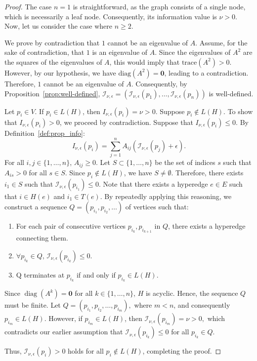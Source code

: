 \documentclass[10pt,a4paper]{amsart}
\begin{document}
\begin{proof}
The case \( n = 1 \) is straightforward, as the graph consists of a single node, which is necessarily a leaf node. Consequently, its information value is \( \nu > 0 \). Now, let us consider the case where \( n \geq 2 \).

We prove by contradiction that \( 1 \) cannot be an eigenvalue of \( A \). Assume, for the sake of contradiction, that \( 1 \) is an eigenvalue of \( A \). Since the eigenvalues of \( A^2 \) are the squares of the eigenvalues of \( A \), this would imply that \( \text{trace}(A^2) > 0 \). However, by our hypothesis, we have \( \text{diag}(A^2) = \mathbf{0} \), leading to a contradiction. Therefore, \( 1 \) cannot be an eigenvalue of \( A \). Consequently, by Proposition~\ref{prop:well-defined}, \( \mathcal{I}_{\nu, \epsilon} = (\mathcal{I}_{\nu, \epsilon}(p_1), \ldots, \mathcal{I}_{\nu, \epsilon}(p_n)) \) is well-defined.

Let $p_i \in V$. If $p_i \in L(H)$, then $I_{\nu, \epsilon}(p_i) = \nu > 0$. Suppose $p_i \notin L(H)$. To show that $I_{\nu, \epsilon}(p_i) > 0$, we proceed by contradiction. Suppose that $I_{\nu, \epsilon}(p_i) \leq 0$. By Definition~\ref{def:prop_info}:
\[
I_{\nu, \epsilon}(p_i)=\sum_{j=1}^{n} A_{ij} (\mathcal{I}_{\nu, \epsilon}(p_j) + \epsilon).
\]
For all \( i, j \in \{1, \ldots, n\} \), \( A_{ij} \geq 0 \). Let \( S \subset \{1, \ldots, n\} \) be the set of indices \( s \) such that \( A_{is} > 0 \) for all \( s \in S \). Since \( p_i \notin L(H) \), we have \( S \neq \emptyset \). Therefore, there exists \( i_1 \in S \) such that \( \mathcal{I}_{\nu,\epsilon}(p_{i_1}) \leq 0 \). Note that there exists a hyperedge \( e \in E \) such that \( i \in H(e) \) and \( i_1 \in T(e) \). By repeatedly applying this reasoning, we construct a sequence 
$Q = (p_{i_1}, p_{i_2}, \ldots)$ of vertices such that:
\begin{enumerate}
    \item For each pair of consecutive vertices \( p_{i_k}, p_{i_{k+1}} \) in \( Q \), there exists a hyperedge connecting them.
    \item \( \forall p_{i_k} \in Q \), \( \mathcal{I}_{\nu,\epsilon}(p_{i_k}) \leq 0 \).
    \item Q terminates at $p_{i_k}$ if and only if $p_{i_k}\in L(H)$.
\end{enumerate}

Since \( \operatorname{diag}(A^k) = \mathbf{0} \) for all \( k \in \{1, \ldots, n\} \), \( H \) is acyclic. Hence, the sequence \( Q \) must be finite. Let $ Q = (p_{i_1}, p_{i_2}, \ldots, p_{i_m}), $
where \( m < n \), and consequently \( p_{i_m} \in L(H) \). However, if \( p_{i_m} \in L(H) \), then 
$ \mathcal{I}_{\nu,\epsilon}(p_{i_m}) = \nu > 0, $
which contradicts our earlier assumption that \( \mathcal{I}_{\nu,\epsilon}(p_{i_k}) \leq 0 \) for all \( p_{i_k} \in Q \).

Thus, \( \mathcal{I}_{\nu,\epsilon}(p_i) > 0 \) holds for all \( p_i \notin L(H) \), completing the proof.


\end{proof}
\end{document}
